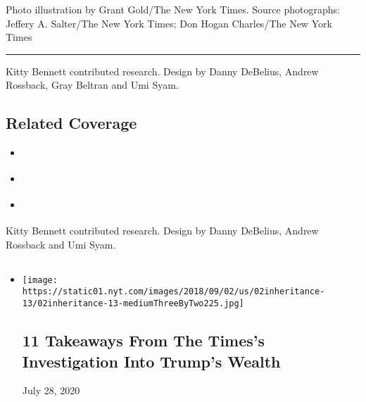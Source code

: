 Photo illustration by Grant Gold/The New York Times. Source photographs:
Jeffery A. Salter/The New York Times; Don Hogan Charles/The New York
Times

\begin{center}\rule{0.5\linewidth}{\linethickness}\end{center}

Kitty Bennett contributed research. Design by Danny DeBelius, Andrew
Rossback, Gray Beltran and Umi Syam.

\hypertarget{related-coverage}{%
\subsection{Related Coverage}\label{related-coverage}}

\begin{itemize}
\tightlist
\item
  \href{https://www.nytimes.com/2018/10/02/us/politics/donald-trump-wealth-fred-trump.html}{}
\item
  \href{undefined/interactive/2018/10/02/us/politics/trump-family-wealth.html}{}
\item
  \href{https://www.nytimes.com/2018/10/02/insider/donald-trump-fred-tax-schemes-wealth.html}{}
\end{itemize}

Kitty Bennett contributed research. Design by Danny DeBelius, Andrew
Rossback and Umi Syam.

\subsection{}

\begin{itemize}
\item
  \href{https://www.nytimes.com/2018/10/02/us/politics/donald-trump-wealth-fred-trump.html}{}

  \texttt{[image: https://static01.nyt.com/images/2018/09/02/us/02inheritance-13/02inheritance-13-mediumThreeByTwo225.jpg]}

  \hypertarget{11-takeaways-from-the-timess-investigation-into-trumps-wealth}{%
  \subsection{11 Takeaways From The Times's Investigation Into Trump's
  Wealth}\label{11-takeaways-from-the-timess-investigation-into-trumps-wealth}}

  July 28, 2020
\end{itemize}

